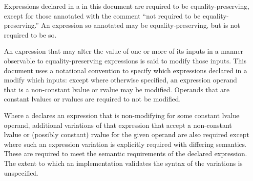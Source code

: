 \pnum
Expressions declared in a  in this document are
required to be equality-preserving, except for those annotated with the comment
``not required to be equality-preserving.'' An expression so annotated
may be equality-preserving, but is not required to be so.

\pnum
An expression that may alter the value of one or more of its inputs in a manner
observable to equality-preserving expressions is said to modify those inputs.
This document uses a notational convention to specify which expressions declared
in a  modify which inputs: except where
otherwise specified, an expression operand that is a non-constant lvalue or
rvalue may be modified. Operands that are constant lvalues or rvalues are
required to not be modified.

\pnum
Where a  declares an expression that is
non-modifying for some constant lvalue operand, additional variations of that
expression that accept a non-constant lvalue or (possibly constant) rvalue for
the given operand are also required except where such an expression variation is
explicitly required with differing semantics. These
 are required to meet the semantic
requirements of the declared expression. The extent to which an implementation
validates the syntax of the variations is unspecified.

